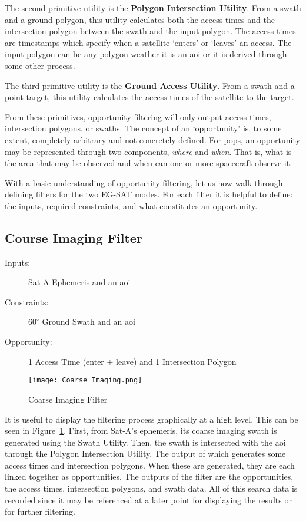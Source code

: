 The second primitive utility is the \textbf{Polygon Intersection Utility}.
From a swath and a ground polygon, this utility calculates both the access
times and the intersection polygon between the swath and the input polygon. The
access times are timestamps which specify when a satellite `enters' or `leaves'
an access. The input polygon can be any polygon weather it is an \gls{aoi} or
it is derived through some other process.

The third primitive utility is the \textbf{Ground Access Utility}. From a swath
and a point target, this utility calculates the access times of the satellite
to the target. 

From these primitives, opportunity filtering will only output access times,
intersection polygons, or swaths. The concept of an `opportunity' is, to some
extent, completely arbitrary and not concretely defined. For \gls{pops}, an
opportunity may be represented through two components, \textit{where} and
\textit{when}. That is, what is the area that may be observed and when can one
or more spacecraft observe it. 

With a basic understanding of opportunity filtering, let us now walk through
defining filters for the two EG-SAT modes. For each filter it is helpful to
define: the inputs, required constraints, and what constitutes an opportunity.

\subsection{Course Imaging Filter}

\begin{description} 

    \item[Inputs:]  Sat-A Ephemeris and an \gls{aoi}

    \item[Constraints:] $60^\circ$ Ground Swath and an \gls{aoi}

    \item[Opportunity:] 1 Access Time (enter + leave) and 1 Intersection Polygon

\end{description} 

\begin{figure}[h]
    \centering
    \texttt{[image: Coarse Imaging.png]} 
    \caption{Coarse Imaging Filter}
    \label{fig:filter-1} 
\end{figure}

It is useful to display the filtering process graphically at a high level.
This can be seen in Figure~\ref{fig:filter-1}. First, from Sat-A's ephemeris,
its coarse imaging swath is generated using the Swath Utility. Then, the swath
is intersected with the \gls{aoi} through the Polygon Intersection Utility. The
output of which generates some access times and intersection polygons. When
these are generated, they are each linked together as opportunities. The
outputs of the filter are the opportunities, the access times, intersection
polygons, and swath data. All of this search data is recorded since it may be
referenced at a later point for displaying the results or for further
filtering.

